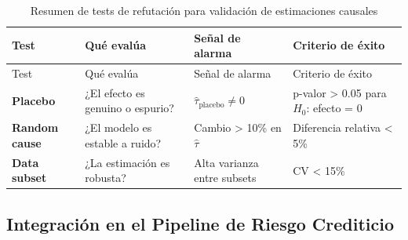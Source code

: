 \documentclass[
  spanish,
  11pt,
  letterpaper,
]{scrbook}
\theoremstyle{plain}
\theoremstyle{remark}
\begin{document}
\begin{longtable}[]{@{}
  >{\raggedright\arraybackslash}p{}
  >{\raggedright\arraybackslash}p{}
  >{\raggedright\arraybackslash}p{}
  >{\raggedright\arraybackslash}p{}@{}}
\caption{Resumen de tests de refutación para validación de estimaciones
causales}\label{tbl-refutation-summary}\tabularnewline
\toprule\noalign{}
\begin{minipage}[b]{\linewidth}\raggedright
Test
\end{minipage} & \begin{minipage}[b]{\linewidth}\raggedright
Qué evalúa
\end{minipage} & \begin{minipage}[b]{\linewidth}\raggedright
Señal de alarma
\end{minipage} & \begin{minipage}[b]{\linewidth}\raggedright
Criterio de éxito
\end{minipage} \\
\midrule\noalign{}
\endfirsthead
\toprule\noalign{}
\begin{minipage}[b]{\linewidth}\raggedright
Test
\end{minipage} & \begin{minipage}[b]{\linewidth}\raggedright
Qué evalúa
\end{minipage} & \begin{minipage}[b]{\linewidth}\raggedright
Señal de alarma
\end{minipage} & \begin{minipage}[b]{\linewidth}\raggedright
Criterio de éxito
\end{minipage} \\
\midrule\noalign{}
\endhead
\bottomrule\noalign{}
\endlastfoot
\textbf{Placebo} & ¿El efecto es genuino o espurio? &
\(\hat{\tau}_{\text{placebo}} \neq 0\) & p-valor \textgreater{} 0.05
para \(H_0\): efecto = 0 \\
\textbf{Random cause} & ¿El modelo es estable a ruido? & Cambio
\textgreater{} 10\% en \(\hat{\tau}\) & Diferencia relativa \textless{}
5\% \\
\textbf{Data subset} & ¿La estimación es robusta? & Alta varianza entre
subsets & CV \textless{} 15\% \\
\end{longtable}

\subsection{Integración en el Pipeline de Riesgo
Crediticio}\label{sec-causal-integration}
\end{document}
